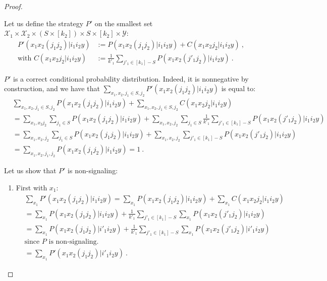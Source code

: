 \begin{proof}
\begin{enumerate}
    Let us define the strategy $P'$ on the smallest set $\mathcal{X}_1\times\mathcal{X}_2\times\left(S \times [k_2]\right)\times S \times [k_2] \times \mathcal{Y}$:
    \begin{equation}
      \begin{aligned}
        P'(x_1x_2(j_1j_2)|i_1i_2y) &:= P(x_1x_2(j_1j_2)|i_1i_2y) + C(x_1x_2j_2|i_1i_2y) \ ,\\
        \text{with } C(x_1x_2j_2|i_1i_2y) &:= \frac{1}{k'_1}\sum_{j'_1 \in [k_1]-S}P(x_1x_2(j'_1j_2)|i_1i_2y) \ .
      \end{aligned}
    \end{equation}

    $P'$ is a correct conditional probability distribution. Indeed, it is nonnegative by construction, and we have that $\sum_{x_1,x_2,j_1 \in S,j_2} P'(x_1x_2(j_1j_2)|i_1i_2y)$ is equal to:
    \begin{equation}
      \begin{aligned}
      &\sum_{x_1,x_2,j_1 \in S,j_2} P(x_1x_2(j_1j_2)|i_1i_2y) + \sum_{x_1,x_2,j_1 \in S,j_2} C(x_1x_2j_2|i_1i_2y)\\
      &= \sum_{x_1,x_2j_2} \sum_{j_1 \in S} P(x_1x_2(j_1j_2)|i_1i_2y) + \sum_{x_1,x_2,j_2}\sum_{j_1 \in S} \frac{1}{k'_1}\sum_{j'_1 \in [k_1]-S}P(x_1x_2(j'_1j_2)|i_1i_2y)\\
        &= \sum_{x_1,x_2,j_2}\sum_{j_1 \in S} P(x_1x_2(j_1j_2)|i_1i_2y) + \sum_{x_1,x_2,j_2} \sum_{j'_1 \in [k_1]-S}P(x_1x_2(j'_1j_2)|i_1i_2y)\\
      &= \sum_{x_1,x_2,j_1,j_2} P(x_1x_2(j_1j_2)|i_1i_2y) = 1 \ .
      \end{aligned}
    \end{equation}
    
    Let us show that $P'$ is non-signaling:
    \begin{enumerate}
    \item First with $x_1$:
    \begin{equation}
      \begin{aligned}
      &\sum_{x_1} P'(x_1x_2(j_1j_2)|i_1i_2y) = \sum_{x_1} P(x_1x_2(j_1j_2)|i_1i_2y) + \sum_{x_1} C(x_1x_2j_2|i_1i_2y)\\
      &= \sum_{x_1} P(x_1x_2(j_1j_2)|i_1i_2y) + \frac{1}{k'_1}\sum_{j'_1 \in [k_1]-S}\sum_{x_1}P(x_1x_2(j'_1j_2)|i_1i_2y)\\
      &= \sum_{x_1} P(x_1x_2(j_1j_2)|i'_1i_2y) + \frac{1}{k'_1}\sum_{j'_1 \in [k_1]-S}\sum_{x_1}P(x_1x_2(j'_1j_2)|i'_1i_2y)\\
      &\text{since $P$ is non-signaling.}\\
      &= \sum_{x_1} P'(x_1x_2(j_1j_2)|i'_1i_2y) \ .
      \end{aligned}
    \end{equation}
    

\end{enumerate}
\end{enumerate}
\end{proof}
